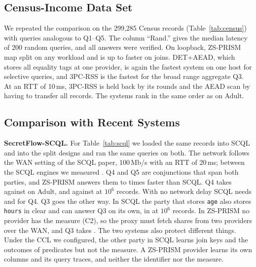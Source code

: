 \documentclass[conference]{IEEEtran}
\newcommand{\sys}{ZS-PRISM}
\begin{document}
\subsection{Census-Income Data Set}
We repeated the comparison on the 299,285 Census records (Table~\ref{tab:census}) with queries analogous to Q1--Q5. The column ``Rand.'' gives the median latency of 200 random queries, and all answers were verified. On loopback, \sys{} \CensusSlowerClause{} map split on any workload and is up to \CensusFaster{} faster on joins. DET+AEAD, which stores all equality tags at one provider, is again the fastest system on one host for selective queries, and 3PC-RSS is the fastest for the broad range aggregate Q3. At an RTT of 10\,ms, 3PC-RSS is held back by its rounds and the AEAD scan by having to transfer all records. The systems rank in the same order as on Adult.

\begin{table}[t]
\centering
\caption{Median query latency (ms) on the Census-Income data set ($N=299{,}285$) over loopback and over an emulated 10\,ms, 100\,Mb/s link. Rand.: median over 200 random conjunctive queries.}
\label{tab:census}
\scriptsize
\setlength{\tabcolsep}{2.2pt}

\end{table}

\subsection{Comparison with Recent Systems}\label{sec:sota}
\textbf{SecretFlow-SCQL.} For Table~\ref{tab:scql} we loaded the same records into SCQL and into the split designs and ran the same queries on both. The network follows the WAN setting of the SCQL paper, 100\,Mb/s with an RTT of 20\,ms; between the SCQL engines we measured \ScqlRtt{}. Q4 and Q5 are conjunctions that span both parties, and \sys{} answers them \ScqlSpeedupMinNum{} to \ScqlSpeedupMaxNum{} times faster than SCQL. Q4 takes \ZSQfourWanA{} against \ScqlQfourWanA{} on Adult, and \EightZSQfourWan{} against \ScqlQfourWanM{} at $10^6$ records. With no network delay SCQL needs \ScqlQfourLocA{} and \ScqlQfourLocM{} for Q4. Q3 goes the other way. In SCQL the party that stores \texttt{age} also stores \texttt{hours} in clear and can answer Q3 on its own, in \ScqlQthreeWanM{} at $10^6$ records. In \sys{} no provider has the measure (C2), so the proxy must fetch shares from two providers over the WAN, and Q3 takes \ZSQthreeWanM{}. The two systems also protect different things. Under the CCL we configured, the other party in SCQL learns join keys and the outcomes of predicates but not the measure. A \sys{} provider learns its own columns and its query traces, and neither the identifier nor the measure.
\end{document}
